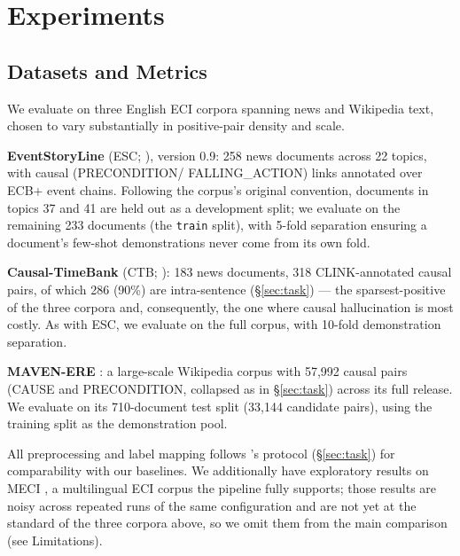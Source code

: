 \documentclass[11pt]{article}
\begin{document}
\section{Experiments}
\label{sec:experiments}

\subsection{Datasets and Metrics}
We evaluate on three English ECI corpora spanning news and Wikipedia text, chosen
to vary substantially in positive-pair density and scale.

\textbf{EventStoryLine} (ESC; \citealp{caselli2017event}), version 0.9: 258 news
documents across 22 topics, with causal (\textsc{PRECONDITION}/
\textsc{FALLING\_ACTION}) links annotated over ECB+ event chains. Following the
corpus's original convention, documents in topics 37 and 41 are held out as a
development split; we evaluate on the remaining 233 documents (the \texttt{train}
split), with 5-fold separation ensuring a document's few-shot demonstrations never
come from its own fold.

\textbf{Causal-TimeBank} (CTB; \citealp{mirza2014annotating}): 183 news documents,
318 CLINK-annotated causal pairs, of which 286 (90\%) are intra-sentence
(\S\ref{sec:task}) --- the sparsest-positive of the three corpora and,
consequently, the one where causal hallucination is most costly. As with ESC, we
evaluate on the full corpus, with 10-fold demonstration separation.

\textbf{MAVEN-ERE} \citep{wang2022mavenere}: a large-scale Wikipedia corpus with
57{,}992 causal pairs (\textsc{CAUSE} and \textsc{PRECONDITION}, collapsed as in
\S\ref{sec:task}) across its full release. We evaluate on its 710-document test
split (33{,}144 candidate pairs), using the training split as the demonstration
pool.

All preprocessing and label mapping follows \citet{gao2023chatgpt}'s protocol
(\S\ref{sec:task}) for comparability with our baselines. We additionally have
exploratory results on MECI \citep{lai2022meci}, a multilingual ECI corpus the
pipeline fully supports; those results are noisy across repeated runs of the same
configuration and are not yet at the standard of the three corpora above, so we
omit them from the main comparison (see Limitations).
\end{document}
